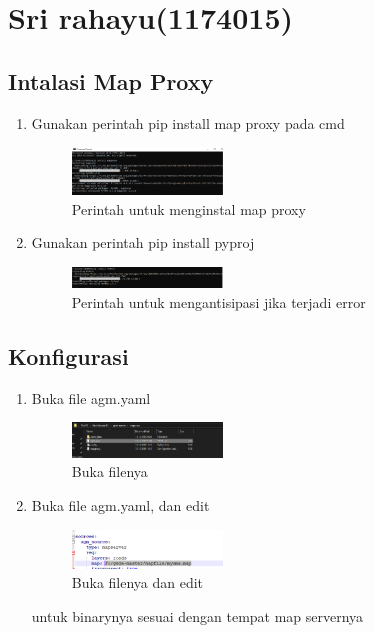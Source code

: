\section{Sri rahayu(1174015)}
\subsection{Intalasi Map Proxy}
\begin{enumerate}
    \item Gunakan perintah pip install map proxy pada cmd
    \hfill\break
    \begin{figure}[H]
		\includegraphics[width=4cm]{figures/1174015/5/4.png}
		\centering
		\caption{Perintah untuk menginstal map proxy}
    \end{figure}
    \item Gunakan perintah pip install pyproj
    \hfill\break
    \begin{figure}[H]
		\includegraphics[width=4cm]{figures/1174015/5/14.png}
		\centering
		\caption{Perintah untuk mengantisipasi jika terjadi error}
    \end{figure}
\end{enumerate}
\subsection{Konfigurasi}
\begin{enumerate}
    \item Buka file agm.yaml
    \hfill\break
    \begin{figure}[H]
		\includegraphics[width=4cm]{figures/1174015/5/15.png}
		\centering
		\caption{Buka filenya}
    \end{figure}
    \item Buka file agm.yaml, dan edit
    \hfill\break
    \begin{figure}[H]
		\includegraphics[width=4cm]{figures/1174015/5/16.png}
		\centering
		\caption{Buka filenya dan edit}
    \end{figure}
    untuk binarynya sesuai dengan tempat map servernya
\end{enumerate}

